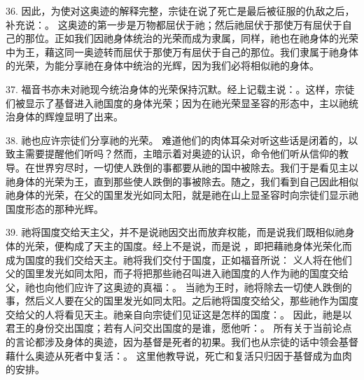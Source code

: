 36. 因此，为使对这奥迹的解释完整，宗徒在说了死亡是最后被征服的仇敌之后，补充说：。 这奥迹的第一步是万物都屈伏于祂；然后祂屈伏于那使万有屈伏于自己的那位。正如我们因祂身体统治的光荣而成为隶属，同样，祂也在祂身体的光荣中为王，藉这同一奥迹转而屈伏于那使万有屈伏于自己的那位。我们隶属于祂身体的光荣，为能分享祂在身体中统治的光辉，因为我们必将相似祂的身体。\par

37. 福音书亦未对祂现今统治身体的光荣保持沉默。经上记载主说：。这样，宗徒们被显示了基督进入祂国度的身体光荣；因为在祂光荣显圣容的形态中，主以祂统治身体的辉煌显明了出来。\par

38. 祂也应许宗徒们分享祂的光荣。 难道他们的肉体耳朵对听这些话是闭着的，以致主需要提醒他们听吗？然而，主暗示着对奥迹的认识，命令他们听从信仰的教导。在世界穷尽时，一切使人跌倒的事都要从祂的国中被除去。我们于是看见主以祂身体的光荣为王，直到那些使人跌倒的事被除去。随之，我们看到自己因此相似祂身体的光荣，在父的国里发光如同太阳，就是祂在山上显圣容时向宗徒们显示祂国度形态的那种光辉。\par

39. 祂将国度交给天主父，并不是说祂因交出而放弃权能，而是说我们既相似祂身体的光荣，便构成了天主的国度。经上不是说，而是说 ，即把藉祂身体光荣化而成为国度的我们交给天主。祂将我们交付于国度，正如福音所说：  义人将在他们父的国里发光如同太阳，而子将把那些祂召叫进入祂国度的人作为祂的国度交给父，祂也向他们应许了这奥迹的真福：。 当祂为王时，祂将除去一切使人跌倒的事，然后义人要在父的国里发光如同太阳。之后祂将国度交给父，那些祂作为国度交给父的人将看见天主。祂亲自向宗徒们见证这是怎样的国度：。 因此，祂是以君王的身份交出国度；若有人问交出国度的是谁，愿他听：。 所有关于当前论点的言论都涉及身体的奥迹，因为基督是死者的初果。我们也从宗徒的话中领会基督藉什么奥迹从死者中复活：。 这里他教导说，死亡和复活只归因于基督成为血肉的安排。\par

